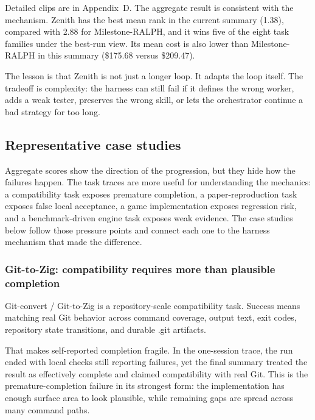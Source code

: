 \documentclass[11pt,a4paper]{article}
\newcommand{\code}[1]{#1}
\begin{document}
\vspace{6pt}

Detailed clips are in Appendix~D. The aggregate result is consistent with the mechanism. Zenith has the best mean rank in the current summary (\code{1.38}), compared with \code{2.88} for Milestone-RALPH, and it wins five of the eight task families under the best-run view. Its mean cost is also lower than Milestone-RALPH in this summary (\code{\$175.68} versus \code{\$209.47}).

The lesson is that Zenith is not just a longer loop. It adapts the loop itself. The tradeoff is complexity: the harness can still fail if it defines the wrong worker, adds a weak tester, preserves the wrong skill, or lets the orchestrator continue a bad strategy for too long.

\subsection{Representative case studies}

Aggregate scores show the direction of the progression, but they hide how the failures happen. The task traces are more useful for understanding the mechanics: a compatibility task exposes premature completion, a paper-reproduction task exposes false local acceptance, a game implementation exposes regression risk, and a benchmark-driven engine task exposes weak evidence. The case studies below follow those pressure points and connect each one to the harness mechanism that made the difference.

\subsubsection{Git-to-Zig: compatibility requires more than plausible completion}

\code{Git-convert} / Git-to-Zig is a repository-scale compatibility task. Success means matching real Git behavior across command coverage, output text, exit codes, repository state transitions, and durable \code{.git} artifacts.

That makes self-reported completion fragile. In the one-session trace, the run ended with local checks still reporting failures, yet the final summary treated the result as effectively complete and claimed compatibility with real Git. This is the premature-completion failure in its strongest form: the implementation has enough surface area to look plausible, while remaining gaps are spread across many command paths.
\end{document}
